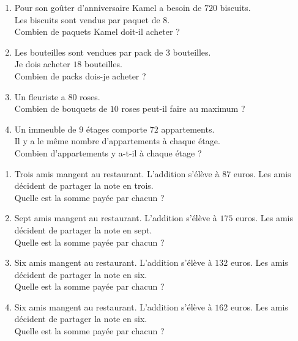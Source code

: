 \documentclass[11pt]{article}
\begin{document}
\begin{exercice}
\begin{multicols}{2}
\begin{enumerate}
\item Pour son goûter d’anniversaire Kamel a besoin de $720$ biscuits.\\
Les biscuits sont vendus par paquet de $8$.\\
Combien de paquets Kamel doit-il acheter ?
\item Les bouteilles sont vendues par pack de $3$ bouteilles.\\
Je dois acheter $18$ bouteilles.\\
Combien de packs dois-je acheter ?
\item Un fleuriste a $80$ roses.\\
Combien de bouquets de $10$ roses peut-il faire au maximum ?
\item Un immeuble de $9$ étages comporte $72$ appartements. \\
Il y a le même nombre d’appartements à chaque étage.\\
Combien d’appartements y a-t-il à chaque étage ?
\end{enumerate}
\end{multicols}
\end{exercice}

\begin{exercice}
\begin{multicols}{2}
\begin{enumerate}
\item Trois amis mangent au restaurant. L'addition s'élève à $87$ euros.
Les amis décident de partager la note en trois.\\
Quelle est la somme payée par chacun ?
\item Sept amis mangent au restaurant. L'addition s'élève à $175$
euros.
Les amis décident de partager la note en sept.\\
Quelle est la somme payée par chacun ?
\item Six amis mangent au restaurant. L'addition s'élève à $132$
euros.
Les amis décident de partager la note en six.\\
Quelle est la somme payée par chacun ?
\item Six amis mangent au restaurant. L'addition s'élève à $162$
euros.
Les amis décident de partager la note en six.\\
Quelle est la somme payée par chacun ?
\end{enumerate}
\end{multicols}
\end{exercice}
\end{document}
